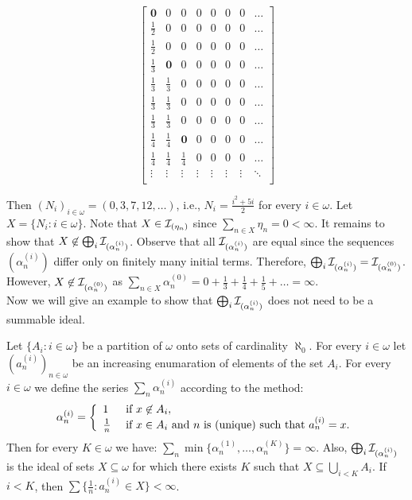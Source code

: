 \documentclass[12pt]{article}
\theoremstyle{plain}
\theoremstyle{definition}
\theoremstyle{remark}
\newcommand{\cI}{{\cal I}}
\begin{document}
\[
  \begin{bmatrix}
     \mathbf{0}  &           0 & 0 & 0 & 0 & 0 & 0 & \ldots\\
    \frac{1}{2} &  0 & 0 & 0 & 0 & 0 & 0 & \ldots\\
    \frac{1}{2} & 0 & 0 & 0 & 0 & 0 & 0 & \ldots\\
    \frac{1}{3} & \mathbf{0} & 0 & 0 & 0 & 0 & 0 & \ldots\\
    \frac{1}{3} & \frac{1}{3} & 0 & 0 & 0 & 0 & 0 & \ldots\\
    \frac{1}{3} & \frac{1}{3} & 0 & 0 & 0 & 0 & 0 & \ldots\\
    \frac{1}{3} & \frac{1}{3} & 0 & 0 & 0 & 0 & 0 & \ldots\\
    \frac{1}{4} & \frac{1}{4} & \mathbf{0} & 0 & 0 & 0 & 0 & \ldots\\
    \frac{1}{4} & \frac{1}{4} & \frac{1}{4} & 0 & 0 & 0 & 0 & \ldots\\
		 \vdots     &      \vdots & \vdots & \vdots & \vdots & \vdots & \vdots & \ddots\\
  \end{bmatrix}
\]

Then $(N_i)_{i\in\omega} = (0, 3, 7, 12, \ldots )$, i.e., $N_i = \frac{i^2 + 5i}{2}$ for every $i\in\omega$.
Let $X= \{N_i \colon i\in\omega\}$. Note that $X \in \cI_{(\eta_n)}$ since $\sum_{n\in X} \eta_n = 0 < \infty$. 
It remains to show that $X\not\in\bigoplus_{i}\cI_{(\alpha_n^{(i)})}$. Observe that all $\cI_{(\alpha_n^{(i)})}$ are equal since the sequences $(\alpha_n^{(i)})$ differ only on finitely many initial terms. Therefore, $\bigoplus_{i}\cI_{(\alpha_n^{(i)})}= \cI_{(\alpha_n^{(0)})}$. However, $X\not\in\cI_{(\alpha_n^{(0)})}$ as $\sum_{n\in X} \alpha_n^{(0)} = 0 +\frac{1}{3} + \frac{1}{4} +\frac{1}{5} +\ldots = \infty$.\\


Now we will give an example to show that $\bigoplus_{i}\cI_{(\alpha_n^{(i)})}$ does not need to be a summable ideal.
	
Let $\{A_i\colon i\in\omega\}$ be a partition of $\omega$ onto sets of cardinality $\aleph_0$. For every $i\in\omega$ let $(a_n^{(i)})_{n\in\omega}$ be an increasing enumaration of elements of the set $A_i$. For every $i\in\omega$ we define the series $\sum_n \alpha_n^{(i)}$ according to the method:
$$\alpha_n^{(i)} = 
\left\{
\begin{array}{ll}
1 & \hbox{\ if\ } x \not\in A_i,\\
\frac{1}{n} & \hbox{\ if\ } x \in A_i \hbox{{\ and\ }} n 
\hbox{{\ is\ (unique)\ such\ that\ }} a_n^{(i)} = x.
\end{array}
\right.$$
Then for every $K \in \omega$ we have: 
$\sum_n \min \{\alpha_n^{(1)}, \ldots, \alpha_n^{(K)}\} = \infty$.
Also, $\bigoplus_{i}\cI_{(\alpha_n^{(i)})}$ is the ideal of sets $X \subseteq \omega$ for which there exists $K$ such that $X \subseteq \bigcup_{i < K} A_i$.
If $i < K$, then $\sum \{\frac{1}{n} \colon a_n^{(i)} \in X\} < \infty$.
\end{document}
